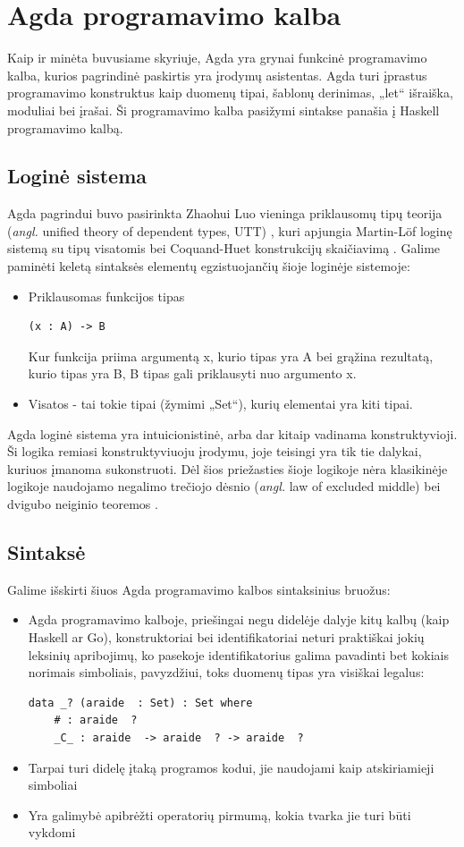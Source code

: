 \documentclass{VUMIFPSkursinis}
\begin{document}
\section{Agda programavimo kalba}
Kaip ir minėta buvusiame skyriuje, Agda yra grynai funkcinė programavimo kalba, kurios pagrindinė paskirtis yra įrodymų asistentas. Agda turi įprastus programavimo konstruktus kaip duomenų tipai, šablonų derinimas, „let“ išraiška, moduliai bei įrašai. Ši programavimo kalba pasižymi sintakse panašia į Haskell programavimo kalbą.
\subsection{Loginė sistema}
Agda pagrindui buvo pasirinkta Zhaohui Luo vieninga priklausomų tipų teorija (\textit{angl.} unified theory of dependent types, UTT) \cite{agdaInitial}, kuri apjungia Martin-Löf loginę sistemą su tipų visatomis bei Coquand-Huet konstrukcijų skaičiavimą \cite{schematicApproach}. Galime paminėti keletą sintaksės elementų egzistuojančių šioje loginėje sistemoje:
\begin{itemize}
	\item{ Priklausomas funkcijos tipas
		\begin{lstlisting}
(x : A) -> B
		\end{lstlisting}
		Kur funkcija priima argumentą x, kurio tipas yra A bei grąžina rezultatą, kurio tipas yra B, B tipas gali priklausyti nuo argumento x.
	}
	\item Visatos - tai tokie tipai (žymimi „Set“), kurių elementai yra kiti tipai.
\end{itemize}
Agda loginė sistema yra intuicionistinė, arba dar kitaip vadinama konstruktyvioji. Ši logika remiasi konstruktyviuoju įrodymu, joje teisingi yra tik tie dalykai, kuriuos įmanoma sukonstruoti. Dėl šios priežasties šioje logikoje nėra klasikinėje logikoje naudojamo negalimo trečiojo dėsnio (\textit{angl.} law of excluded middle) bei dvigubo neiginio teoremos \cite{intuitionistic}.
\subsection{Sintaksė}
Galime išskirti šiuos Agda programavimo kalbos sintaksinius bruožus:
\begin{itemize}
	\item {Agda programavimo kalboje, priešingai negu didelėje dalyje kitų kalbų (kaip Haskell ar Go), konstruktoriai bei identifikatoriai neturi praktiškai jokių leksinių apribojimų, ko pasekoje identifikatorius galima pavadinti bet kokiais norimais simboliais, pavyzdžiui, toks duomenų tipas yra visiškai legalus:
	\begin{lstlisting}
data _? (araide  : Set) : Set where
	# : araide  ?
	_C_ : araide  -> araide  ? -> araide  ?
	\end{lstlisting}
	}
	\item Tarpai turi didelę įtaką programos kodui, jie naudojami kaip atskiriamieji simboliai
	\item Yra galimybė apibrėžti operatorių pirmumą, kokia tvarka jie turi būti vykdomi 
\end{itemize}
\end{document}
